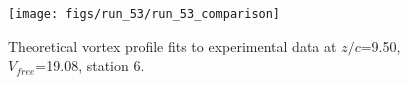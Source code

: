\begin{figure}[H]
\centering
\texttt{[image: figs/run\_53/run\_53\_comparison]}
\caption{Theoretical vortex profile fits to experimental data at $z/c$=9.50, $V_{free}$=19.08, station 6.}
\label{fig:run_53_comparison}
\end{figure}


